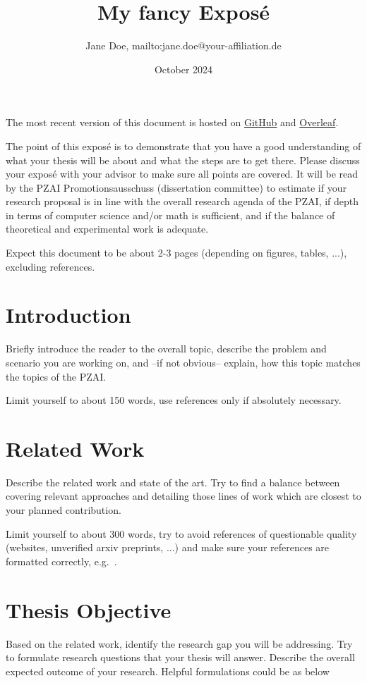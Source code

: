 \documentclass[11pt,DIV=16,parskip=half]{scrartcl}
\title{My fancy Exposé}
\author{Jane Doe, mailto:jane.doe@your-affiliation.de}
\date{October 2024}
\begin{document}
\maketitle

The most recent version of this document is hosted on \href{https://github.com/th-nuernberg/pzai-expose}{GitHub} and \href{https://www.overleaf.com/read/ctgdqqhnpksb#2bc10c}{Overleaf}.

The point of this exposé is to demonstrate that you have a good understanding of what your thesis will be about and what the steps are to get there.
Please discuss your exposé with your advisor to make sure all points are covered.
It will be read by the PZAI Promotionsausschuss (dissertation committee) to estimate if your research proposal is in line with the overall research agenda of the PZAI, if depth in terms of computer science and/or math is sufficient, and if the balance of theoretical and experimental work is adequate.

Expect this document to be about 2-3 pages (depending on figures, tables, ...), excluding references.


\section{Introduction}
Briefly introduce the reader to the overall topic, describe the problem and scenario you are working on, and --if not obvious-- explain, how this topic matches the topics of the PZAI.

Limit yourself to about 150 words, use references only if absolutely necessary.



\section{Related Work}
Describe the related work and state of the art.
Try to find a balance between covering relevant approaches and detailing those lines of work which are closest to your planned contribution.

Limit yourself to about 300 words, try to avoid references of questionable quality (websites, unverified arxiv preprints, ...) and make sure your references are formatted correctly, e.g.~\cite{cooley1965-fft}.



\section{Thesis Objective}
Based on the related work, identify the research gap you will be addressing.
Try to formulate research questions that your thesis will answer.
Describe the overall expected outcome of your research.
Helpful formulations could be as below
\end{document}
